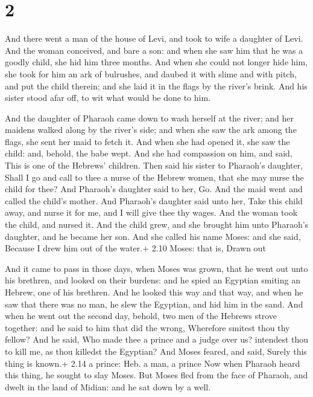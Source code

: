\hypertarget{section-1}{%
\section{2}\label{section-1}}

 And there went a man of the house of Levi, and took to wife
a daughter of Levi.  And the woman conceived, and bare a
son: and when she saw him that he was a goodly child, she hid him three
months.  And when she could not longer hide him, she took
for him an ark of bulrushes, and daubed it with slime and with pitch,
and put the child therein; and she laid it in the flags by the river's
brink.  And his sister stood afar off, to wit what would be
done to him.

 And the daughter of Pharaoh came down to wash herself at
the river; and her maidens walked along by the river's side; and when
she saw the ark among the flags, she sent her maid to fetch it.
 And when she had opened it, she saw the child: and, behold,
the babe wept. And she had compassion on him, and said, This is one of
the Hebrews' children.  Then said his sister to Pharaoh's
daughter, Shall I go and call to thee a nurse of the Hebrew women, that
she may nurse the child for thee?  And Pharaoh's daughter
said to her, Go. And the maid went and called the child's mother.
 And Pharaoh's daughter said unto her, Take this child away,
and nurse it for me, and I will give thee thy wages. And the woman took
the child, and nursed it.  And the child grew, and she
brought him unto Pharaoh's daughter, and he became her son. And she
called his name Moses: and she said, Because I drew him out of the
water.+ 2.10 Moses: that is, Drawn out

 And it came to pass in those days, when Moses was grown,
that he went out unto his brethren, and looked on their burdens: and he
spied an Egyptian smiting an Hebrew, one of his brethren. 
And he looked this way and that way, and when he saw that there was no
man, he slew the Egyptian, and hid him in the sand.  And
when he went out the second day, behold, two men of the Hebrews strove
together: and he said to him that did the wrong, Wherefore smitest thou
thy fellow?  And he said, Who made thee a prince and a
judge over us? intendest thou to kill me, as thou killedst the Egyptian?
And Moses feared, and said, Surely this thing is known.+ 2.14 a prince:
Heb. a man, a prince  Now when Pharaoh heard this thing, he
sought to slay Moses. But Moses fled from the face of Pharaoh, and dwelt
in the land of Midian: and he sat down by a well.

